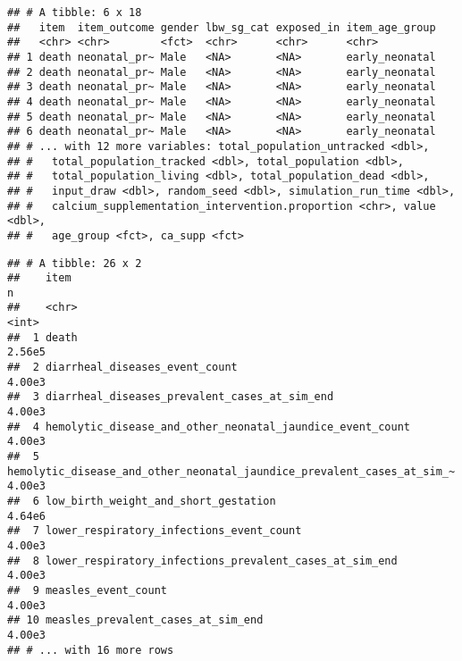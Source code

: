 \documentclass[]{article}
\newenvironment{Shaded}{\begin{snugshade}}{\end{snugshade}}
\newcommand{\KeywordTok}[1]{\textcolor[rgb]{0.13,0.29,0.53}{\textbf{#1}}}
\newcommand{\NormalTok}[1]{#1}
\newcommand{\OperatorTok}[1]{\textcolor[rgb]{0.81,0.36,0.00}{\textbf{#1}}}
\newcommand{\StringTok}[1]{\textcolor[rgb]{0.31,0.60,0.02}{#1}}
\begin{document}
\begin{Shaded}
\end{Shaded}

\begin{verbatim}
## # A tibble: 6 x 18
##   item  item_outcome gender lbw_sg_cat exposed_in item_age_group
##   <chr> <chr>        <fct>  <chr>      <chr>      <chr>         
## 1 death neonatal_pr~ Male   <NA>       <NA>       early_neonatal
## 2 death neonatal_pr~ Male   <NA>       <NA>       early_neonatal
## 3 death neonatal_pr~ Male   <NA>       <NA>       early_neonatal
## 4 death neonatal_pr~ Male   <NA>       <NA>       early_neonatal
## 5 death neonatal_pr~ Male   <NA>       <NA>       early_neonatal
## 6 death neonatal_pr~ Male   <NA>       <NA>       early_neonatal
## # ... with 12 more variables: total_population_untracked <dbl>,
## #   total_population_tracked <dbl>, total_population <dbl>,
## #   total_population_living <dbl>, total_population_dead <dbl>,
## #   input_draw <dbl>, random_seed <dbl>, simulation_run_time <dbl>,
## #   calcium_supplementation_intervention.proportion <chr>, value <dbl>,
## #   age_group <fct>, ca_supp <fct>
\end{verbatim}

\begin{Shaded}
\end{Shaded}

\begin{verbatim}
## # A tibble: 26 x 2
##    item                                                                        n
##    <chr>                                                                   <int>
##  1 death                                                                  2.56e5
##  2 diarrheal_diseases_event_count                                         4.00e3
##  3 diarrheal_diseases_prevalent_cases_at_sim_end                          4.00e3
##  4 hemolytic_disease_and_other_neonatal_jaundice_event_count              4.00e3
##  5 hemolytic_disease_and_other_neonatal_jaundice_prevalent_cases_at_sim_~ 4.00e3
##  6 low_birth_weight_and_short_gestation                                   4.64e6
##  7 lower_respiratory_infections_event_count                               4.00e3
##  8 lower_respiratory_infections_prevalent_cases_at_sim_end                4.00e3
##  9 measles_event_count                                                    4.00e3
## 10 measles_prevalent_cases_at_sim_end                                     4.00e3
## # ... with 16 more rows
\end{verbatim}
\end{document}
